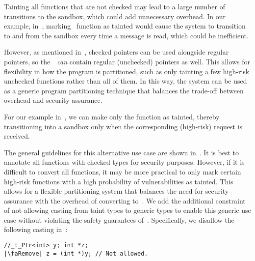 Tainting all functions that are not checked may lead to a large number of transitions to the sandbox, which could add unnecessary overhead. In our example, in~, marking~ function as tainted would cause the system to transition to and from the sandbox every time a message is read, which could be inefficient. 

However, as mentioned in~, checked pointers can be used alongside regular pointers, so the~\cregion{}~\emph{can} contain regular (unchecked) pointers as well.
%
This allows for flexibility in how the program is partitioned, such as only tainting a few high-risk unchecked functions rather than all of them. In this way, the system can be used as a generic program partitioning technique that balances the trade-off between overhead and security assurance.

For our example in~, we can make only the function  as tainted, thereby transitioning into a sandbox only when the corresponding (high-risk) request is received.

The general guidelines for this alternative use case are shown in~.
It is best to annotate all functions with checked types for security purposes. However, if it is difficult to convert all functions, it may be more practical to only mark certain high-risk functions with a high probability of vulnerabilities as tainted. This allows for a flexible partitioning system that balances the need for security assurance with the overhead of converting to~\checkedc.
We add the additional constraint of not allowing casting from taint types to generic types to enable this generic use case without violating the safety guarantees of~\systemname.
Specifically, we disallow the following casting in~\cregion:
\begin{verbatim}
//_t_Ptr<int> y; int *z;
|\faRemove| z = (int *)y; // Not allowed.
\end{verbatim}
\iffalse

